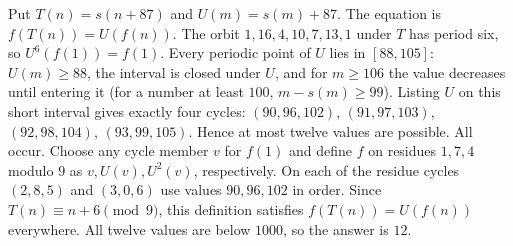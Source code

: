 Put $T(n)=s(n+87)$ and $U(m)=s(m)+87$. The equation is $f(T(n))=U(f(n))$. The orbit $1,16,4,10,7,13,1$ under $T$ has period six, so $U^6(f(1))=f(1)$. Every periodic point of $U$ lies in $[88,105]$: $U(m)\ge88$, the interval is closed under $U$, and for $m\ge106$ the value decreases until entering it (for a number at least $100$, $m-s(m)\ge99$). Listing $U$ on this short interval gives exactly four cycles: $(90,96,102)$, $(91,97,103)$, $(92,98,104)$, $(93,99,105)$. Hence at most twelve values are possible. All occur. Choose any cycle member $v$ for $f(1)$ and define $f$ on residues $1,7,4$ modulo $9$ as $v,U(v),U^2(v)$, respectively. On each of the residue cycles $(2,8,5)$ and $(3,0,6)$ use values $90,96,102$ in order. Since $T(n)\equiv n+6\pmod9$, this definition satisfies $f(T(n))=U(f(n))$ everywhere. All twelve values are below $1000$, so the answer is $\boxed{12}$.
